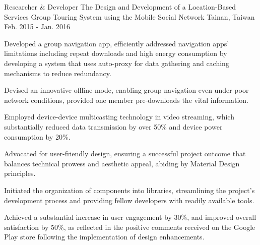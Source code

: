 

\begin{cventries}

  \cventry
    {Researcher \& Developer} %
    {The Design and Development of a Location-Based Services Group Touring System using the Mobile Social Network} %
    {Tainan, Taiwan} %
    {Feb. 2015 - Jan. 2016} %
    {
      \begin{cvitems} %
        \item {Developed a group navigation app, efficiently addressed navigation apps' limitations including repeat downloads and high energy consumption by developing a system that uses auto-proxy for data gathering and caching mechanisms to reduce redundancy.}
        \item {Devised an innovative offline mode, enabling group navigation even under poor network conditions, provided one member pre-downloads the vital information.}
        \item {Employed device-device multicasting technology in video streaming, which substantially reduced data transmission by over 50\% and device power consumption by 20\%.}
        \item {Advocated for user-friendly design, ensuring a successful project outcome that balances technical prowess and aesthetic appeal, abiding by Material Design principles.}
        \item {Initiated the organization of components into libraries, streamlining the project's development process and providing fellow developers with readily available tools.}
        \item {Achieved a substantial increase in user engagement by 30\%, and improved overall satisfaction by 50\%, as reflected in the positive comments received on the Google Play store following the implementation of design enhancements.}
      \end{cvitems}
    }

\end{cventries}
